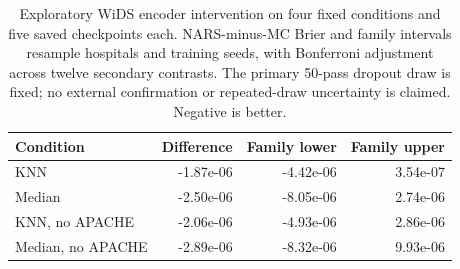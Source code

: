 \begin{table}[t]
\caption{Exploratory WiDS encoder intervention on four fixed conditions and five saved checkpoints each. NARS-minus-MC Brier and family intervals resample hospitals and training seeds, with Bonferroni adjustment across twelve secondary contrasts. The primary 50-pass dropout draw is fixed; no external confirmation or repeated-draw uncertainty is claimed. Negative is better.}
\label{tab:wids_encoder}
\centering\scriptsize
\setlength{\tabcolsep}{4pt}
\begin{tabular}{@{}lrrr@{}}
\toprule
Condition & Difference & Family lower & Family upper \\
\midrule
KNN & -1.87e-06 & -4.42e-06 & 3.54e-07 \\
Median & -2.50e-06 & -8.05e-06 & 2.74e-06 \\
KNN, no APACHE & -2.06e-06 & -4.93e-06 & 2.86e-06 \\
Median, no APACHE & -2.89e-06 & -8.32e-06 & 9.93e-06 \\
\bottomrule
\end{tabular}
\end{table}
